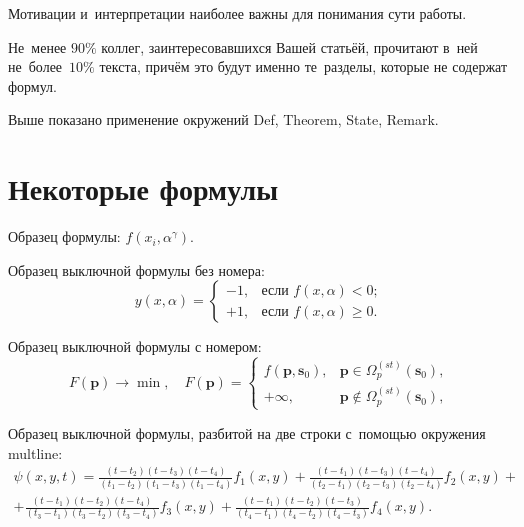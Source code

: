 \documentclass[10pt]{article}
\begin{document}
\begin{State}
    Мотивации и~интерпретации наиболее важны для понимания сути работы.
\end{State}

\begin{Theorem}
    Не~менее $90\%$ коллег, заинтересовавшихся Вашей статьёй,
    прочитают в~ней не~более~$10\%$ текста,
    причём это будут именно те~разделы, которые не содержат формул.
\end{Theorem}

\begin{Remark}
    Выше показано применение окружений
    Def, Theorem, State, Remark.
\end{Remark}

\section{Некоторые формулы}

Образец формулы: $f(x_i,\alpha^\gamma)$.

Образец выключной формулы без номера:
\[
    y(x,\alpha) =
    \begin{cases}
        -1, & \text{если } f(x,\alpha)<0;  \\
        +1, & \text{если } f(x,\alpha)\geq 0.
    \end{cases}
\]

Образец выключной формулы с номером:
\begin{equation}\label{eq:cases01}
    F(\mathbf{p}) \to \min ,\quad
    F(\mathbf{p}) =
        \begin{cases}
            f(\mathbf{p},\mathbf{s}_0), & \mathbf{p} \in \Omega _p^{(st)}(\mathbf{s}_0), \\
            + \infty , & \mathbf{p} \notin \Omega _p^{(st)}(\mathbf{s}_0),
        \end{cases}
\end{equation}

Образец выключной формулы, разбитой на две строки с~помощью окружения multline:
\begin{multline}\label{eq:multline01}
\psi (x,y,t)=
    \frac{(t-t_{2})(t-t_{3})(t-t_{4})}{(t_{1}-t_{2})(t_{1}-t_{3})(t_{1}-t_{4})}  f_{1}(x,y) +
    \frac{(t-t_{1})(t-t_{3})(t-t_{4})}{(t_{2}-t_{1})(t_{2}-t_{3})(t_{2}-t_{4})}  f_{2}(x,y) + \\
   +\frac{(t-t_{1})(t-t_{2})(t-t_{4})}{(t_{3}-t_{1})(t_{3}-t_{2})(t_{3}-t_{4})}  f_{3}(x,y) +
    \frac{(t-t_{1})(t-t_{2})(t-t_{3})}{(t_{4}-t_{1})(t_{4}-t_{2})(t_{4}-t_{3})}  f_{4} (x,y).
\end{multline}
\end{document}
